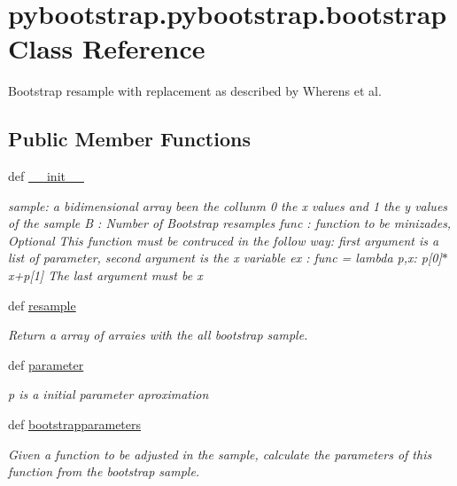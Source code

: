 \hypertarget{classpybootstrap_1_1pybootstrap_1_1bootstrap}{\section{pybootstrap.\-pybootstrap.\-bootstrap Class Reference}
\label{classpybootstrap_1_1pybootstrap_1_1bootstrap}
}


Bootstrap resample with replacement as described by Wherens et al.  


\subsection*{Public Member Functions}
\begin{DoxyCompactItemize}
\item 
def \hyperlink{classpybootstrap_1_1pybootstrap_1_1bootstrap_a555780b5796d31b2b29b2bb57011366e}{\-\_\-\-\_\-init\-\_\-\-\_\-}
\begin{DoxyCompactList}\small\item\em sample\-: a bidimensional array been the collunm 0 the x values and 1 the y values of the sample B \-: Number of Bootstrap resamples func \-: function to be minizades, Optional This function must be contruced in the follow way\-: first argument is a list of parameter, second argument is the x variable ex \-: func = lambda p,x\-: p\mbox{[}0\mbox{]}$\ast$x+p\mbox{[}1\mbox{]} The last argument must be x \end{DoxyCompactList}\item 
def \hyperlink{classpybootstrap_1_1pybootstrap_1_1bootstrap_ae5a9363131e365897dcba301f395dfc4}{resample}
\begin{DoxyCompactList}\small\item\em Return a array of arraies with the all bootstrap sample. \end{DoxyCompactList}\item 
def \hyperlink{classpybootstrap_1_1pybootstrap_1_1bootstrap_aaf32f0d45eb14d5fbfd159f64363bb2b}{parameter}
\begin{DoxyCompactList}\small\item\em p is a initial parameter aproximation \end{DoxyCompactList}\item 
def \hyperlink{classpybootstrap_1_1pybootstrap_1_1bootstrap_ace6c39962a2ffdae1f90141b4eda6441}{bootstrapparameters}
\begin{DoxyCompactList}\small\item\em Given a function to be adjusted in the sample, calculate the parameters of this function from the bootstrap sample. \end{DoxyCompactList}\item 

\end{DoxyCompactItemize}
